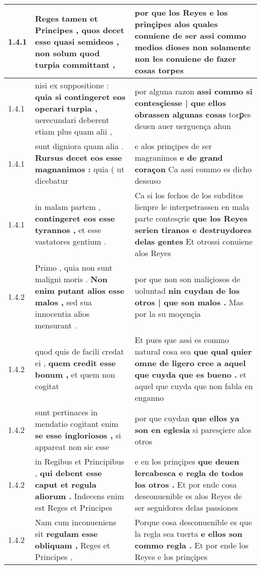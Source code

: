 \begin{tabular}{|p{1cm}|p{6.5cm}|p{6.5cm}|}
1.4.1 & Reges tamen et Principes , \textbf{ quos decet esse quasi semideos , } non solum quod turpia committant , & por que los Reyes e los prinçipes alos quales conuiene de ser \textbf{ assi commo medios dioses } non solamente non les conuiene de fazer cosas torpes \\\hline
1.4.1 & nisi ex suppositione : \textbf{ quia si contingeret eos operari turpia , } uerecundari deberent etiam plus quam alii , & por alguna razon \textbf{ assi commo si contesçiesse | que ellos obrassen algunas cosas } torꝑes deuen auer uerguença ahun \\\hline
1.4.1 & sunt digniora quam alia . \textbf{ Rursus decet eos esse magnanimos : } quia ( ut dicebatur & e alos prinçipes de ser magranimos \textbf{ e de grand coraçon } Ca assi commo es dicho dessuso \\\hline
1.4.1 & in malam partem , \textbf{ contingeret eos esse tyrannos , } et esse vastatores gentium . & Ca si los fechos de los subditos lienpre le interpetrassen en mala parte contesçrie \textbf{ que los Reyes serien tiranos e destruydores delas gentes } Et otrossi conuiene alos Reyes \\\hline
1.4.2 & Primo , quia non sunt maligni moris . \textbf{ Non enim putant alios esse malos , } sed sua innocentia alios mensurant . & por que non son maliçiosos de uoluntad \textbf{ nin cuydan de los otros | que son malos . } Mas por la su moçençia \\\hline
1.4.2 & quod quis de facili credat ei , \textbf{ quem credit esse bonum , } et quem non cogitat & Et pues que assi es commo natural cosa sea \textbf{ que qual quier omne de ligero cree a aquel que cuyda que es bueno . } et aquel que cuyda que non fabla en enganno \\\hline
1.4.2 & sunt pertinaces in mendatio cogitant enim \textbf{ se esse ingloriosos , } si appareat non sic esse & por que cuydan \textbf{ que ellos ya son en eglesia } si paresçiere alos otros \\\hline
1.4.2 & in Regibus et Principibus , \textbf{ qui debent esse caput et regula aliorum . } Indecens enim est Reges et Principes & e en los prinçipes \textbf{ que deuen lercabesca e regla de todos los otros . } Et por ende cosa desconuenible es alos Reyes de ser segnidores delas passiones \\\hline
1.4.2 & Nam cum inconueniens sit \textbf{ regulam esse obliquam , } Reges et Principes , & Porque cosa desconuenible es que la regla sea tuerta \textbf{ e ellos son commo regla . } Et por ende los Reyes e los prinçipes \\\hline

\end{tabular}

